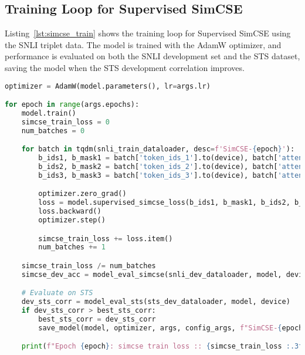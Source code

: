 \subsection{Training Loop for Supervised SimCSE}
Listing~\ref{lst:simcse_train} shows the training loop for Supervised SimCSE using the SNLI triplet data. The model is trained with the AdamW optimizer, and performance is evaluated on both the SNLI development set and the STS dataset, saving the model when the STS development correlation improves.

\begin{lstlisting}[language=Python, caption={Training SimCSE with Triplet SNLI Data}, label={lst:simcse_train}, basicstyle=\ttfamily\small, keywordstyle=\color{blue}, commentstyle=\color{green}, stringstyle=\color{red},linewidth=\textwidth]
optimizer = AdamW(model.parameters(), lr=args.lr)

for epoch in range(args.epochs):
    model.train()
    simcse_train_loss = 0
    num_batches = 0

    for batch in tqdm(snli_train_dataloader, desc=f'SimCSE-{epoch}'):
        b_ids1, b_mask1 = batch['token_ids_1'].to(device), batch['attention_mask_1'].to(device)
        b_ids2, b_mask2 = batch['token_ids_2'].to(device), batch['attention_mask_2'].to(device)
        b_ids3, b_mask3 = batch['token_ids_3'].to(device), batch['attention_mask_3'].to(device)

        optimizer.zero_grad()
        loss = model.supervised_simcse_loss(b_ids1, b_mask1, b_ids2, b_mask2, b_ids3, b_mask3)
        loss.backward()
        optimizer.step()

        simcse_train_loss += loss.item()
        num_batches += 1

    simcse_train_loss /= num_batches
    simcse_dev_acc = model_eval_simcse(snli_dev_dataloader, model, device)

    # Evaluate on STS
    dev_sts_corr = model_eval_sts(sts_dev_dataloader, model, device)
    if dev_sts_corr > best_sts_corr:
        best_sts_corr = dev_sts_corr
        save_model(model, optimizer, args, config_args, f"SimCSE-{epoch}")

    print(f"Epoch {epoch}: simcse train loss :: {simcse_train_loss :.3f}, simcse dev acc :: {simcse_dev_acc :.3f}, dev sts corr :: {dev_sts_corr :.3f}")
\end{lstlisting}

